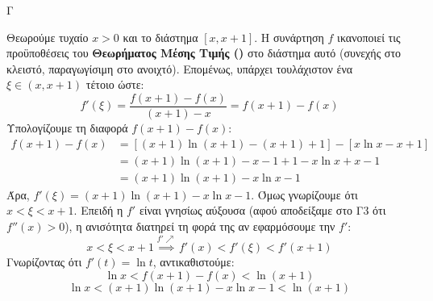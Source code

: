 \begin{thema}{Γ}
\begin{erwthma}
\item Θεωρούμε τυχαίο $x > 0$ και το διάστημα $[x, x+1]$. 
Η συνάρτηση $f$ ικανοποιεί τις προϋποθέσεις του \textbf{Θεωρήματος Μέσης Τιμής ()} στο διάστημα αυτό (συνεχής στο κλειστό, παραγωγίσιμη στο ανοιχτό). Επομένως, υπάρχει τουλάχιστον ένα $\xi \in (x, x+1)$ τέτοιο ώστε:
\[ f'(\xi) = \frac{f(x+1) - f(x)}{(x+1) - x} = f(x+1) - f(x) \]
Υπολογίζουμε τη διαφορά $f(x+1) - f(x)$:
\begin{align*}
f(x+1) - f(x) &= \left[ (x+1)\ln(x+1) - (x+1) + 1 \right] - \left[ x \ln x - x + 1 \right] \\
&= (x+1)\ln(x+1) - x - 1 + 1 - x \ln x + x - 1 \\
&= (x+1)\ln(x+1) - x \ln x - 1
\end{align*}
Άρα, $f'(\xi) = (x+1)\ln(x+1) - x \ln x - 1$.
Όμως γνωρίζουμε ότι $x < \xi < x+1$. Επειδή η $f'$ είναι γνησίως αύξουσα (αφού αποδείξαμε στο Γ3 ότι $f''(x)>0$), η ανισότητα διατηρεί τη φορά της αν εφαρμόσουμε την $f'$:
\[ x < \xi < x+1 \overset{f' \nearrow}{\implies} f'(x) < f'(\xi) < f'(x+1) \]
Γνωρίζοντας ότι $f'(t) = \ln t$, αντικαθιστούμε:
\[ \ln x < f(x+1) - f(x) < \ln(x+1) \]
\[ \ln x < (x+1)\ln(x+1) - x \ln x - 1 < \ln(x+1) \]
\end{erwthma}
\end{thema}

